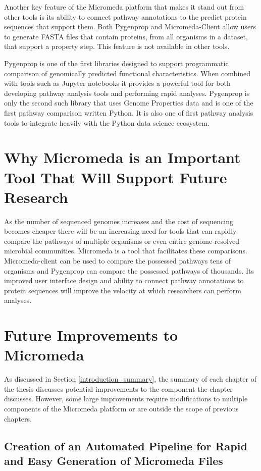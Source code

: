 Another key feature of the Micromeda platform that makes it stand out from other tools is its ability to connect pathway annotations to the predict protein sequences that support them. Both Pygenprop and Micromeda-Client allow users to generate FASTA files that contain proteins, from all organisms in a dataset, that support a property step. This feature is not available in other tools.

Pygenprop is one of the first libraries designed to support programmatic comparison of genomically predicted functional characteristics. When combined with tools such as Jupyter notebooks it provides a powerful tool for both developing pathway analysis tools and performing rapid analyses. Pygenprop is only the second such library that uses Genome Properties data and is one of the first pathway comparison written Python. It is also one of first pathway analysis tools to integrate heavily with the Python data science ecosystem.

\section{Why Micromeda is an Important Tool That Will Support Future Research}

As the number of sequenced genomes increases and the cost of sequencing becomes cheaper there will be an increasing need for tools that can rapidly compare the pathways of multiple organisms or even entire genome-resolved microbial communities. Micromeda is a tool that facilitates these comparisons. Micromeda-client can be used to compare the possessed pathways tens of organisms and Pygenprop can compare the possessed pathways of thousands. Its improved user interface design and ability to connect pathway annotations to protein sequences will improve the velocity at which researchers can perform analyses.

\section{Future Improvements to Micromeda}

As discussed in Section \ref{introduction_summary}, the summary of each chapter of the thesis discusses potential improvements to the component the chapter discusses. However, some large improvements require modifications to multiple components of the Micromeda platform or are outside the scope of previous chapters.

\subsection{Creation of an Automated Pipeline for Rapid and Easy Generation of Micromeda Files}


